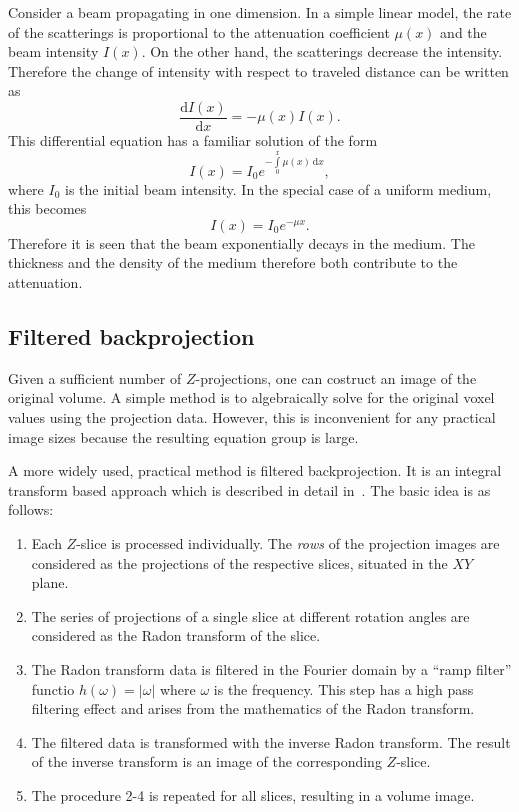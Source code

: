 \documentclass[a4paper,twoside,12pt]{article}
\begin{document}
Consider a beam propagating in one dimension. In a simple linear model, the rate of the scatterings is proportional to the attenuation coefficient $\mu(x)$ and the beam intensity $I(x)$. On the other hand, the scatterings decrease the intensity. Therefore the change of intensity with respect to traveled distance can be written as
\begin{equation}
    \label{eq:bl_ode}
    \frac{\mathrm{d}I(x)}{\mathrm{d}x} = -\mu (x) I (x).
\end{equation}
This differential equation has a familiar solution of the form
\begin{equation}
    \label{eq:bl}
    I(x) = I_0 e ^ { -\int\limits_0^x \mu(x)\,\mathrm{d}x },
\end{equation}
where $I_0$ is the initial beam intensity. In the special case of a uniform medium, this becomes
\begin{equation}
    \label{eq:bl_linear}
    I(x) = I_0 e ^ { -\mu x }.
\end{equation}
Therefore it is seen that the beam exponentially decays in the medium. The thickness and the density of the medium therefore both contribute to the attenuation.

\subsection{Filtered backprojection}
Given a sufficient number of $Z$-projections, one can costruct an image of the original volume. A simple method is to algebraically solve for the original voxel values using the projection data. However, this is inconvenient for any practical image sizes because the resulting equation group is large.

A more widely used, practical method is filtered backprojection. It is an integral transform based approach which is described in detail in~\cite{radon}. The basic idea is as follows:
\begin{enumerate}
    \item Each $Z$-slice is processed individually. The \emph{rows} of the projection images are considered as the projections of the respective slices, situated in the $XY$ plane.

    \item The series of projections of a single slice at different rotation angles are considered as the Radon transform of the slice.

    \item The Radon transform data is filtered in the Fourier domain by a ``ramp filter'' functio $h(\omega) = |\omega|$ where $\omega$ is the frequency. This step has a high pass filtering effect and arises from the mathematics of the Radon transform.

    \item The filtered data is transformed with the inverse Radon transform. The result of the inverse transform is an image of the corresponding $Z$-slice.

    \item The procedure 2-4 is repeated for all slices, resulting in a volume image.
\end{enumerate}
\end{document}
